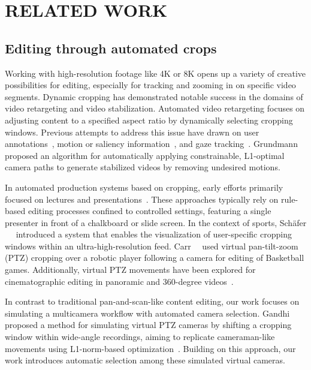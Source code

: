 \section{RELATED WORK}
\subsection{Editing through automated crops}

Working with high-resolution footage like 4K or 8K opens up a variety of creative possibilities for editing, especially for tracking and zooming in on specific video segments. Dynamic cropping has demonstrated notable success in the domains of video retargeting and video stabilization. Automated video retargeting focuses on adjusting content to a specified aspect ratio by dynamically selecting cropping windows. Previous attempts to address this issue have drawn on user annotations~\cite{10.1145}, motion or saliency information~\cite{wang2010motion,liu2006video}, and gaze tracking~\cite{rachavarapu2018watch}. Grundmann~\etal~\cite{5995525} proposed an algorithm for automatically applying constrainable, L1-optimal camera paths to generate stabilized videos by removing undesired motions. 

In automated production systems based on cropping, early efforts primarily focused on lectures and presentations~\cite{heck2007virtual,zhang2008automated}. These approaches typically rely on rule-based editing processes confined to controlled settings, featuring a single presenter in front of a chalkboard or slide screen. In the context of sports, Schäfer ~\etal~\cite{schafer2010ultra} introduced a system that enables the visualization of user-specific cropping windows within an ultra-high-resolution feed. Carr~\etal~\cite{carr2013hybrid} used virtual pan-tilt-zoom (PTZ) cropping over a robotic player following a camera for editing of Basketball games. Additionally, virtual PTZ movements have been explored for cinematographic editing in panoramic and 360-degree videos~\cite{su2016pano2vid,tang2019joint,10.1145/2744411}.

In contrast to traditional pan-and-scan-like content editing, our work focuses on simulating a multicamera workflow with automated camera selection. Gandhi~\etal~\cite{vcs} proposed a method for simulating virtual PTZ cameras by shifting a cropping window within wide-angle recordings, aiming to replicate cameraman-like movements using L1-norm-based optimization~\cite{5995525}. Building on this approach, our work introduces automatic selection among these simulated virtual cameras. 

